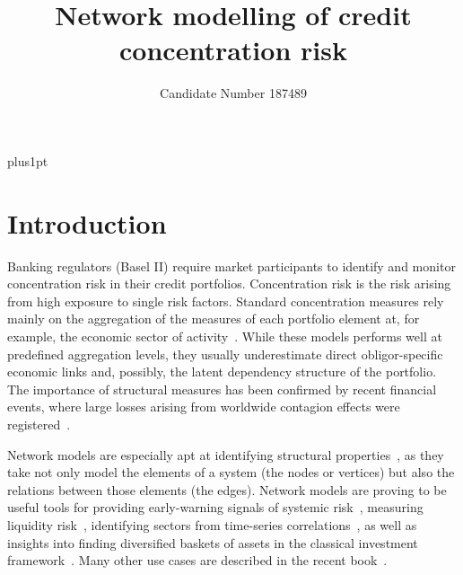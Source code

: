 \documentclass[12pt,beltcrest]{ociamthesis} %
\title{Network modelling
of credit concentration risk}
\author{Candidate Number 187489}        %
\begin{document}
\baselineskip=18pt plus1pt

\setcounter{secnumdepth}{3}
\setcounter{tocdepth}{3}


\maketitle                  %

\begin{romanpages}          %
\tableofcontents            %
\listoffigures              %
\end{romanpages}            %

\chapter{Introduction}



Banking regulators (Basel II) require market participants to identify and monitor concentration risk in their credit portfolios.
Concentration risk is the risk arising from high exposure to single risk factors.
Standard concentration measures rely mainly on the aggregation of the measures of each portfolio element at, for example, the economic sector of activity~\cite{lutkebohmert2008concentration}.
While these models performs well at predefined aggregation levels, they usually underestimate direct obligor-specific economic links and, possibly, the latent dependency structure of the portfolio.
The importance of structural measures has been confirmed by recent financial events, where large losses arising from worldwide contagion effects were registered~\cite{Kazi:2013vr}.
	
Network models are especially apt at identifying structural properties~\cite{newman2010networks}, as they take not only model the elements of a system (the nodes or vertices) but also the relations between those elements (the edges).
Network models are proving to be useful tools for providing early-warning signals of systemic risk~\cite{Squartini:2013ev}, measuring liquidity risk~\cite{Karas:2012tp}, identifying sectors from time-series correlations~\cite{Onnela:2004vz,Fenn:2009uf,Fenn:2011kp}, as well as insights into finding diversified baskets of assets in the classical investment framework~\cite{Pozzi:2013ci}.
Many other use cases are described in the recent book~\cite{Soramaki2016}.
\end{document}
